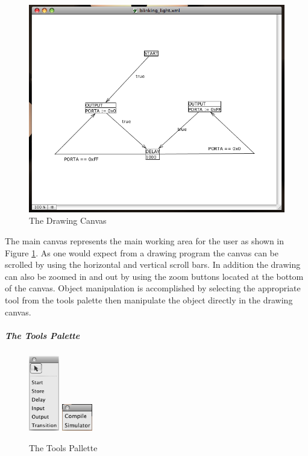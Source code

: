 \begin{figure}[htp]
    \centering
    \includegraphics[width=\imgmedium]{./images/plcedit_canvas.png}
    \caption{The Drawing Canvas}
    \label{fig:plcedit_canvas}
\end{figure}

The main canvas represents the main working area for the user as shown 
in Figure \ref{fig:plcedit_canvas}. As one would expect from a drawing
program the canvas can be scrolled by using the horizontal and vertical 
scroll bars. In addition the drawing can also be zoomed in and out by 
using the zoom buttons located at the bottom of the canvas. Object 
manipulation is accomplished by selecting the appropriate tool from the 
tools palette then manipulate the object directly in the drawing canvas.

\subparagraph{The Tools Palette}

\begin{figure}[htp]
    \centering
    \includegraphics[width=50px]{./images/plcedit_tools.png}
    \includegraphics[width=50px]{./images/plcedit_actions.png}
    \caption{The Tools Pallette}
    \label{fig:plcedit_tools}
\end{figure}

